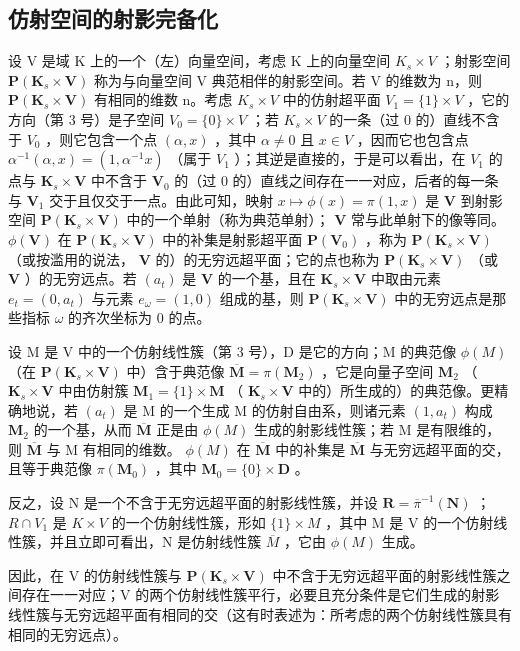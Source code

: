 \subsection{仿射空间的射影完备化}

设 V 是域 K 上的一个（左）向量空间，考虑 K 上的向量空间 \(K_{s} \times V\) ；射影空间 \(\mathbf{P}(\mathbf{K}_{s} \times \mathbf{V})\) 称为与向量空间 V 典范相伴的射影空间。若 V 的维数为 n，则 \(\mathbf{P}(\mathbf{K}_{s} \times \mathbf{V})\) 有相同的维数 n。考虑 \(K_{s} \times V\) 中的仿射超平面 \(V_{1} = \{1\} \times V\) ，它的方向（第 3 号）是子空间 \(V_{0} = \{0\} \times V\) ；若 \(K_{s} \times V\) 的一条（过 0 的）直线不含于 \(V_{0}\) ，则它包含一个点 \((\alpha, x)\) ，其中 \(\alpha \neq 0\) 且 \(x \in V\) ，因而它也包含点 \(\alpha^{-1}(\alpha, x) = (1, \alpha^{-1}x)\) （属于 \(V_{1}\) ）；其逆是直接的，于是可以看出，在 \(V_{1}\) 的点与 \(\mathbf{K}_s \times \mathbf{V}\) 中不含于 \(\mathbf{V}_0\) 的（过 0 的）直线之间存在一一对应，后者的每一条与 \(\mathbf{V}_1\) 交于且仅交于一点。由此可知，映射 \(x \mapsto \phi(x) = \pi(1, x)\) 是 \(\mathbf{V}\) 到射影空间 \(\mathbf{P}(\mathbf{K}_s \times \mathbf{V})\) 中的一个单射（称为典范单射）； \(\mathbf{V}\) 常与此单射下的像等同。 \(\phi(\mathbf{V})\) 在 \(\mathbf{P}(\mathbf{K}_s \times \mathbf{V})\) 中的补集是射影超平面 \(\mathbf{P}(\mathbf{V}_0)\) ，称为 \(\mathbf{P}(\mathbf{K}_s \times \mathbf{V})\) （或按滥用的说法， \(\mathbf{V}\) 的）的无穷远超平面；它的点也称为 \(\mathbf{P}(\mathbf{K}_s \times \mathbf{V})\) （或 \(\mathbf{V}\) ）的无穷远点。若 \((a_t)\) 是 \(\mathbf{V}\) 的一个基，且在 \(\mathbf{K}_s \times \mathbf{V}\) 中取由元素 \(e_t = (0, a_t)\) 与元素 \(e_\omega = (1, 0)\) 组成的基，则 \(\mathbf{P}(\mathbf{K}_s \times \mathbf{V})\) 中的无穷远点是那些指标 \(\omega\) 的齐次坐标为 0 的点。

设 M 是 V 中的一个仿射线性簇（第 3 号），D 是它的方向；M 的典范像 \(\phi(M)\) （在 \(\mathbf{P}(\mathbf{K}_s \times \mathbf{V})\) 中）含于典范像 \(\overline{\mathbf{M}} = \pi(\mathbf{M}_2)\) ，它是向量子空间 \(\mathbf{M}_2\) （ \(\mathbf{K}_s \times \mathbf{V}\) 中由仿射簇 \(\mathbf{M}_1 = \{1\} \times \mathbf{M}\) （ \(\mathbf{K}_s \times \mathbf{V}\) 中的）所生成的）的典范像。更精确地说，若 \((a_t)\) 是 M 的一个生成 M 的仿射自由系，则诸元素 \((1, a_t)\) 构成 \(\mathbf{M}_2\) 的一个基，从而 \(\overline{\mathbf{M}}\) 正是由 \(\phi(M)\) 生成的射影线性簇；若 M 是有限维的，则 \(\overline{\mathbf{M}}\) 与 M 有相同的维数。 \(\phi(M)\) 在 \(\overline{\mathbf{M}}\) 中的补集是 \(\overline{\mathbf{M}}\) 与无穷远超平面的交，且等于典范像 \(\pi(\mathbf{M}_0)\) ，其中 \(\mathbf{M}_0 = \{0\} \times \mathbf{D}\) 。

反之，设 N 是一个不含于无穷远超平面的射影线性簇，并设 \(\mathbf{R} = \overline{\pi}^{-1}(\mathbf{N})\) ； \(R \cap V_{1}\) 是 \(K \times V\) 的一个仿射线性簇，形如 \(\{1\} \times M\) ，其中 M 是 V 的一个仿射线性簇，并且立即可看出，N 是仿射线性簇 \(\overline{M}\) ，它由 \(\phi(M)\) 生成。

因此，在 V 的仿射线性簇与 \(\mathbf{P}(\mathbf{K}_{s} \times \mathbf{V})\) 中不含于无穷远超平面的射影线性簇之间存在一一对应；V 的两个仿射线性簇平行，必要且充分条件是它们生成的射影线性簇与无穷远超平面有相同的交（这有时表述为：所考虑的两个仿射线性簇具有相同的无穷远点）。

